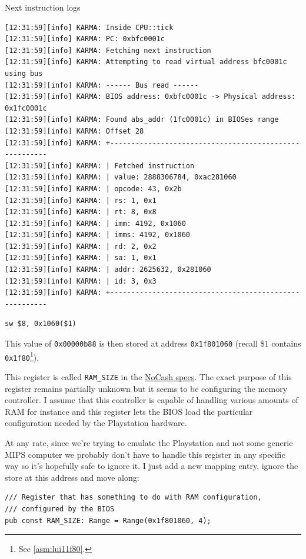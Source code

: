 \documentclass[a4paper]{article}
\newcommand{\code}[1] {\texttt{#1}}
\begin{document}
Next instruction logs
\begin{verbatim}
[12:31:59][info] KARMA: Inside CPU::tick
[12:31:59][info] KARMA: PC: 0xbfc0001c
[12:31:59][info] KARMA: Fetching next instruction
[12:31:59][info] KARMA: Attempting to read virtual address bfc0001c using bus
[12:31:59][info] KARMA: ------ Bus read ------
[12:31:59][info] KARMA: BIOS address: 0xbfc0001c -> Physical address: 0x1fc0001c
[12:31:59][info] KARMA: Found abs_addr (1fc0001c) in BIOSes range
[12:31:59][info] KARMA: Offset 28
[12:31:59][info] KARMA: +-------------------------------------------------------
[12:31:59][info] KARMA: | Fetched instruction 
[12:31:59][info] KARMA: | value: 2888306784, 0xac281060
[12:31:59][info] KARMA: | opcode: 43, 0x2b
[12:31:59][info] KARMA: | rs: 1, 0x1
[12:31:59][info] KARMA: | rt: 8, 0x8
[12:31:59][info] KARMA: | imm: 4192, 0x1060
[12:31:59][info] KARMA: | imms: 4192, 0x1060
[12:31:59][info] KARMA: | rd: 2, 0x2
[12:31:59][info] KARMA: | sa: 1, 0x1
[12:31:59][info] KARMA: | addr: 2625632, 0x281060
[12:31:59][info] KARMA: | id: 3, 0x3
[12:31:59][info] KARMA: +-------------------------------------------------------
\end{verbatim}

\begin{lstlisting}[language=assembly]
sw $8, 0x1060($1)
\end{lstlisting}

This value of \code{0x00000b88} is then stored at address
\code{0x1f801060} (recall \$1 contains \code{0x1f80}\footnote{See \ref{asm:lui11f80}.}).

This register is called \code{RAM\_SIZE} in the
\href{problemkaputt.de/psx-spx.htm#memorycontrol}{NoCash specs}. The
exact purpose of this register remains partially unknown but it seems
to be configuring the memory controller. I assume that this controller
is capable of handling various amounts of RAM for instance and this
register lets the BIOS load the particular configuration needed by the
Playstation hardware.

At any rate, since we're trying to emulate the Playstation and not
some generic MIPS computer we probably don't have to handle this
register in any specific way so it's hopefully safe to ignore it. I
just add a new mapping entry, ignore the store at this address and
move along:

\begin{lstlisting}
/// Register that has something to do with RAM configuration,
/// configured by the BIOS
pub const RAM_SIZE: Range = Range(0x1f801060, 4);
\end{lstlisting}
\end{document}

